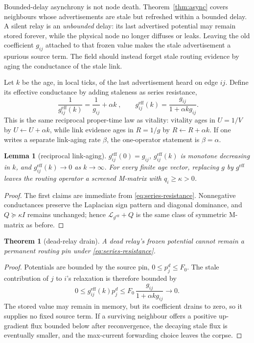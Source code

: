\documentclass[11pt]{article}
\theoremstyle{plain}
\newtheorem*{namedtheorem}{Theorem}
\newtheorem*{namedlemma}{Lemma}
\numberwithin{equation}{section}
\begin{document}
Bounded-delay asynchrony is not node death. Theorem~\ref{thm:async} covers neighbours whose advertisements are stale but refreshed within a bounded delay. A silent relay is an \emph{unbounded} delay: its last advertised potential may remain stored forever, while the physical node no longer diffuses or leaks. Leaving the old coefficient $g_{ij}$ attached to that frozen value makes the stale advertisement a spurious source term. The field should instead forget stale routing evidence by aging the conductance of the stale link.

Let $k$ be the age, in local ticks, of the last advertisement heard on edge $ij$. Define its effective conductance by adding staleness as series resistance,
\begin{equation}\label{eq:series-resistance}
\boxed{\;\frac{1}{g^{\mathrm{eff}}_{ij}(k)}=\frac{1}{g_{ij}}+\alpha k\;},\qquad
 g^{\mathrm{eff}}_{ij}(k)=\frac{g_{ij}}{1+
\alpha k g_{ij}}.
\end{equation}
This is the same reciprocal proper-time law as vitality: vitality ages in $U=1/V$ by $U\leftarrow U+\alpha k$, while link evidence ages in $R=1/g$ by $R\leftarrow R+\alpha k$. If one writes a separate link-aging rate $\beta$, the one-operator statement is $\beta=\alpha$.

\begin{namedlemma}[reciprocal link-aging]
$g^{\mathrm{eff}}_{ij}(0)=g_{ij}$, $g^{\mathrm{eff}}_{ij}(k)$ is monotone decreasing in $k$, and $g^{\mathrm{eff}}_{ij}(k)\to0$ as $k\to\infty$. For every finite age vector, replacing $g$ by $g^{\mathrm{eff}}$ leaves the routing operator a screened M-matrix with $q_i\ge\kappa>0$.
\end{namedlemma}
\begin{proof}
The first claims are immediate from \eqref{eq:series-resistance}. Nonnegative conductances preserve the Laplacian sign pattern and diagonal dominance, and $Q\succeq\kappa I$ remains unchanged; hence $\mathcal L_{g^{\mathrm{eff}}}+Q$ is the same class of symmetric M-matrix as before.
\end{proof}

\begin{namedtheorem}[dead-relay drain]
A dead relay's frozen potential cannot remain a permanent routing pin under \eqref{eq:series-resistance}.
\end{namedtheorem}
\begin{proof}
Potentials are bounded by the source pin, $0\le p^d_j\le F_0$. The stale contribution of $j$ to $i$'s relaxation is therefore bounded by
\[
0\le g^{\mathrm{eff}}_{ij}(k)p^d_j\le F_0\,\frac{g_{ij}}{1+\alpha k g_{ij}}\longrightarrow 0.
\]
The stored value may remain in memory, but its coefficient drains to zero, so it supplies no fixed source term. If a surviving neighbour offers a positive up-gradient flux bounded below after reconvergence, the decaying stale flux is eventually smaller, and the max-current forwarding choice leaves the corpse.
\end{proof}
\end{document}
